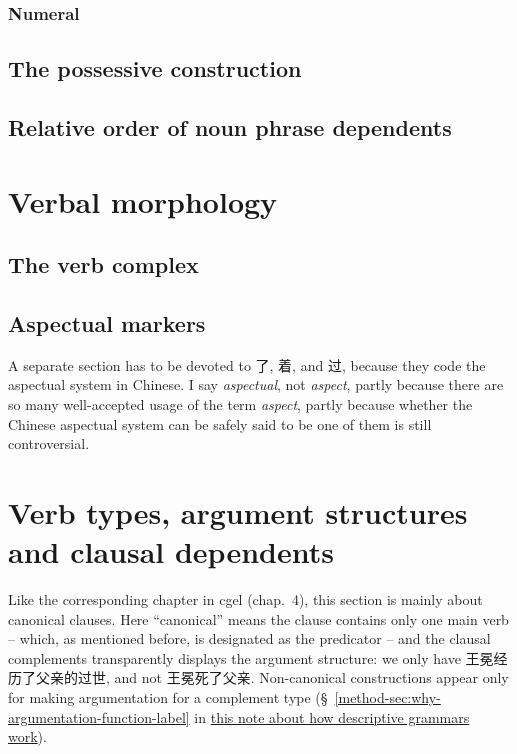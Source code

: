 \documentclass[UTF8, a4paper, oneside, scheme=plain]{ctexart}
\newcommand*{\citesec}[1]{\S~{#1}}
\newcommand*{\citechap}[1]{chap.~{#1}}
\newcommand*{\term}[1]{\emph{#1}}
\newcommand{\method}{\href{../methodology/glossing.pdf}{this note about how descriptive grammars work}}
\begin{document}
\subsubsection{Numeral}\label{sec:numeral-classifier}

\subsection{The possessive construction}\label{sec:possession}


\subsection{Relative order of noun phrase dependents}

\section{Verbal morphology}

\subsection{The verb complex}

\subsection{Aspectual markers}\label{sec:aspectual}

A separate section has to be devoted to 了, 着, and 过,
because they code the aspectual system in Chinese.
I say \term{aspectual}, not \term{aspect},
partly because there are so many well-accepted usage of the term \term{aspect},
partly because whether the Chinese aspectual system can be safely said to be one of them is still controversial.

\section{Verb types, argument structures and clausal dependents}\label{sec:verb-type-canonical}


Like the corresponding chapter in \ac{cgel} (\citechap{4}),
this section is mainly about canonical clauses.
Here ``canonical'' means
the clause contains only one main verb 
-- which, as mentioned before, is designated as the predicator -- 
and the clausal complements transparently displays the argument structure:
we only have 王冕经历了父亲的过世, and not 王冕死了父亲.
Non-canonical constructions appear only for making argumentation for a complement type
(\citesec{\ref{method-sec:why-argumentation-function-label}} in \method).
\end{document}

